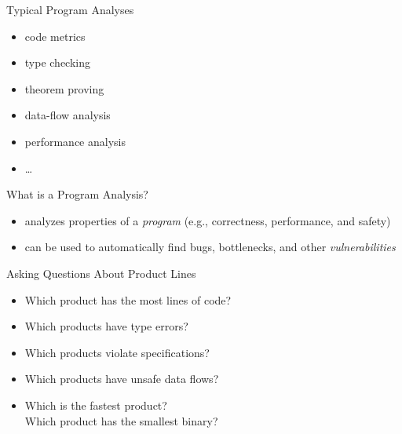 \begin{frame}{\myframetitle}
	\begin{mycolumns}[t,widths={47}]
		\begin{note}{Typical Program Analyses}
			\begin{mycolumns}[c,animation=none]
				\begin{itemize}
					\item code metrics
					\item type checking
					\item theorem proving
					\item data-flow analysis
					\item performance analysis
					\item \ldots
				\end{itemize}
			\mynextcolumn
				\centering{}
			\end{mycolumns}
		\end{note}
		\begin{definition}{What is a Program Analysis?}
			\begin{itemize}
				\item analyzes properties of a \emph{program} (e.g., correctness, performance, and safety)
				\item can be used to automatically find bugs, bottlenecks, and other \emph{vulnerabilities}
			\end{itemize}
		\end{definition}
		\mynextcolumn
		\begin{example}{Asking Questions About Product Lines}
			\begin{itemize}
				\item Which product has the most lines of code? 
				\item Which products have type errors? 
				\item Which products violate specifications? 
				\item Which products have unsafe data flows? 
				\item Which is the fastest product? \\
					Which product has the smallest binary? 

\end{itemize}
\end{example}
\end{mycolumns}
\end{frame}
